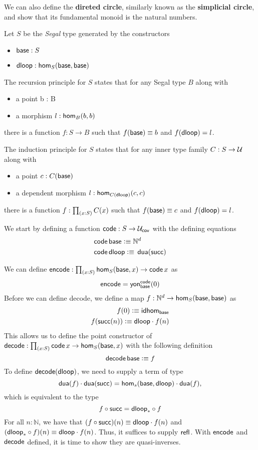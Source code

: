 \documentclass[main.tex]{subfiles}
\begin{document}
We can also define the \textbf{direted circle}, similarly known as the \textbf{simplicial circle}, and show that its fundamental
monoid is the natural numbers.

Let $S$ be the \textit{Segal} type generated by the constructors
\begin{itemize}
    \item $\ba : S$
    \item $\dl : \ho[S]{\ba}{\ba}$
\end{itemize}
The recursion principle for $S$ states that for any Segal type $B$ along with
\begin{itemize}
    \item a point b : B
    \item a morphism $l : \ho[B]{b}{b}$
\end{itemize}
there is a function $f : S \to B$ such that $f(\ba) \equiv b$ and $f(\dl) = l$.

The induction principle for $S$ states that for any inner type family $C : S \to \U$ along with 
\begin{itemize}
    \item a point $c : C(\ba)$
    \item a dependent morphism $l : \ho[C(\dl)]{c}{c}$
\end{itemize}
there is a function $f : \prd{x:S}C(x)$ such that $f(\ba) \equiv c$ and $f(\dl) = l$.

We start by defining a function $\co : S \to \uc$ with the defining equations
\begin{align*}
    &\co\,\ba \defeq \Nd\\
    &\co\,\dl \defeq \, \dua(\su)
\end{align*}

We can define $\eco : \prd{x : S}\ho[S]{\ba}{x} \to \co\,x$ as 
\begin{align*}
    \eco = \yon{\co}{\ba}(0)
\end{align*}
Before we can define decode, we define a map $f : \Nd \to \ho[S]{\ba}{\ba}$ as 
\begin{align*}
    f(0) \defeq \idhom{\ba}\\
    f(\su(n)) \defeq \dl \cdot f(n)
\end{align*}
This allows us to define the point constructor of $\dco : \prd{x:S}\co\,x \to \ho[S]{\ba}{x}$ with the following definition 
\[
\dco \, \ba \defeq f
\]
To define $\dco(\dl)$, we need to supply a term of type 
\[
\dua(f) \cdot \dua(\su) = \ho[s]{\ba}{\dl} \cdot \dua(f),
\]
which is equivalent to the type 
\[
f \circ \su = \dl_* \circ f 
\]
For all $n : \mathbb{N}$, we have that $(f \circ \su)(n) \equiv \dl \cdot f(n)$ and $(\dl_* \circ f )(n) \equiv \dl \cdot f(n)$. Thus,
it suffices to supply $\refl{}$. With $\eco$ and $\dco$ defined, it is time to show they are quasi-inverses.
\end{document}
